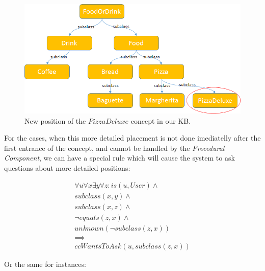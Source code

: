 \begin{figure}[H]
	\centering
		\includegraphics[width=1\textwidth]{figures/kbCorrectPosition.png}
	\caption{New position of the $PizzaDeluxe$ concept in our KB.}
	\label{fig:kbCorrectPosition}
\end{figure}

For the cases, when this more detailed placement is not done imediatelly after
the first entrance of the concept, and cannot be handled by the 
\emph{Procedural Component}, we can have a special rule which will cause
the system to ask questions about more detailed positions:

\begin{equation}\label{rule:autoSubclass}
\begin{gathered}
 \forall u \forall x \exists y \forall z:
 is (u,User) \land \\
 subclass(x,y) \land \\
 subclass(x,z) \land \\
 \lnot equals(z,x) \land \\
 unknown(\lnot subclass(z,x)) \\
 \implies\\
 ccWantsToAsk(u,subclass(z,x))
\end{gathered}
\end{equation}

Or the same for instances: 

